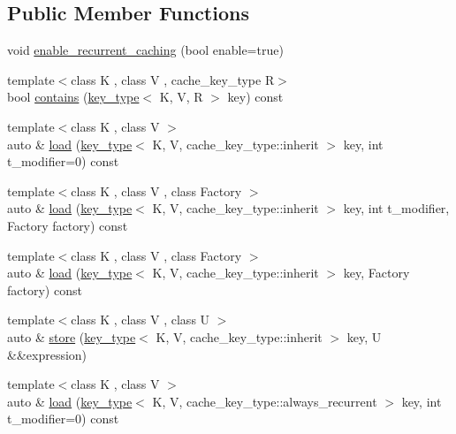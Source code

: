\subsection*{Public Member Functions}
\begin{DoxyCompactItemize}
\item 
void \hyperlink{structbc_1_1nn_1_1Cache_a9fcf5a41d0e0a818ab29db438db392f0}{enable\+\_\+recurrent\+\_\+caching} (bool enable=true)
\item 
{\footnotesize template$<$class K , class V , cache\+\_\+key\+\_\+type R$>$ }\\bool \hyperlink{structbc_1_1nn_1_1Cache_a7aa132ff36acd0bff790e4c68f60b40b}{contains} (\hyperlink{structbc_1_1nn_1_1Cache_aedd77c5710dcb5f9edd8ecb3c3041048}{key\+\_\+type}$<$ K, V, R $>$ key) const
\item 
{\footnotesize template$<$class K , class V $>$ }\\auto \& \hyperlink{structbc_1_1nn_1_1Cache_a0234b2950dfb3bd7152090ce6ee4c521}{load} (\hyperlink{structbc_1_1nn_1_1Cache_aedd77c5710dcb5f9edd8ecb3c3041048}{key\+\_\+type}$<$ K, V, cache\+\_\+key\+\_\+type\+::inherit $>$ key, int t\+\_\+modifier=0) const
\item 
{\footnotesize template$<$class K , class V , class Factory $>$ }\\auto \& \hyperlink{structbc_1_1nn_1_1Cache_ae86e94f09dad94f95ed404493bf276b1}{load} (\hyperlink{structbc_1_1nn_1_1Cache_aedd77c5710dcb5f9edd8ecb3c3041048}{key\+\_\+type}$<$ K, V, cache\+\_\+key\+\_\+type\+::inherit $>$ key, int t\+\_\+modifier, Factory factory) const
\item 
{\footnotesize template$<$class K , class V , class Factory $>$ }\\auto \& \hyperlink{structbc_1_1nn_1_1Cache_a1e82cb0f2285c277b716f5509b785b76}{load} (\hyperlink{structbc_1_1nn_1_1Cache_aedd77c5710dcb5f9edd8ecb3c3041048}{key\+\_\+type}$<$ K, V, cache\+\_\+key\+\_\+type\+::inherit $>$ key, Factory factory) const
\item 
{\footnotesize template$<$class K , class V , class U $>$ }\\auto \& \hyperlink{structbc_1_1nn_1_1Cache_a69df8779e44138168af98b688af9c0d1}{store} (\hyperlink{structbc_1_1nn_1_1Cache_aedd77c5710dcb5f9edd8ecb3c3041048}{key\+\_\+type}$<$ K, V, cache\+\_\+key\+\_\+type\+::inherit $>$ key, U \&\&expression)
\item 
{\footnotesize template$<$class K , class V $>$ }\\auto \& \hyperlink{structbc_1_1nn_1_1Cache_acbee3bebd817f7bfebe16311a6e1f091}{load} (\hyperlink{structbc_1_1nn_1_1Cache_aedd77c5710dcb5f9edd8ecb3c3041048}{key\+\_\+type}$<$ K, V, cache\+\_\+key\+\_\+type\+::always\+\_\+recurrent $>$ key, int t\+\_\+modifier=0) const

\end{DoxyCompactItemize}
